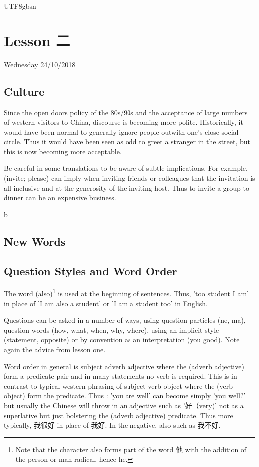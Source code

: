 \documentclass{article}
\newcommand{\myfont}{gbsn} %
\begin{document}
 
\begin{CJK}{UTF8}{\myfont} 
\section{Lesson 二}

Wednesday 24/10/2018

\subsection{Culture}

Since the open doors policy of the 80s/90s and the acceptance of large numbers of western visitors to China, discourse is becoming more polite.  Historically, it would have been normal to generally ignore people outwith one's close social circle.  Thus it would have been seen as odd to greet a stranger in the street, but this is now becoming more acceptable.

Be careful in some translations to be aware of subtle implications.   For example,  (invite; please) can imply when inviting friends or colleagues that the invitation is all-inclusive and at the generosity of the inviting host.   Thus to invite a group to dinner can be an expensive business.

b\subsection{New Words}


\subsection{Question Styles and Word Order}

The word  (also)\footnote{Note that the character  also forms part of the word 他 with the addition of the person or man radical, hence he.} is used at the beginning of sentences.   Thus, 'too student I am' in place of 'I am also a student' or 'I am a student too' in English.

Questions can be asked in a number of ways, using question particles (ne, ma), question words (how, what, when, why, where), using an implicit style (statement, opposite) or by convention as an interpretation (you good).  Note again the advice from lesson one.

Word order in general is subject adverb adjective where the (adverb adjective) form a predicate pair and in many statements no verb is required.  This is in contrast to typical western phrasing of subject verb object where the (verb object) form the predicate.   Thus : 'you are well' can become simply 'you well?' but usually the Chinese will throw in an adjective such as '好（very)' not as a superlative but just bolstering the (adverb adjective) predicate.  Thus more typically, 我很好 in place of 我好.  In the negative, also such as 我不好.


\end{CJK}
\end{document}
